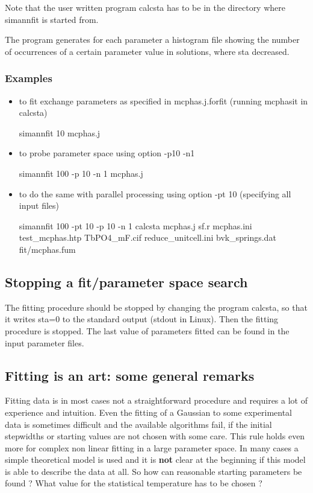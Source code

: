 Note that the user written program {\prg calcsta} has to be in the
directory where {\prg simannfit} is started from.

The program generates for each parameter a histogram file showing the number of occurrences
of a certain parameter value in solutions, where sta decreased.

\subsubsection{Examples}

\begin{itemize}
\item    to fit exchange parameters as specified in mcphas.j.forfit (running mcphasit in calcsta)
  
simannfit 10 mcphas.j     

\item    to probe parameter space using option -p10 -n1

 {\prg simannfit 100  -p 10 -n 1  mcphas.j}

\item     to do the same with parallel processing using option -pt 10 (specifying all input files)
  
 {\prg simannfit 100 -pt 10  -p 10 -n 1  calcsta mcphas.j sf.r mcphas.ini test\_mcphas.htp TbPO4\_mF.cif reduce\_unitcell.ini bvk\_springs.dat fit/mcphas.fum}

\end{itemize}
\subsection{Stopping a fit/parameter space search}

The fitting procedure should be stopped by changing the program {\prg calcsta}, so that it
writes {\prg sta=0} to the standard output (stdout in Linux). Then the fitting
procedure is stopped. The last value of parameters fitted can be found in the
input parameter files.

\subsection{Fitting is an art: some general remarks}

Fitting data is in most cases not a straightforward procedure and requires
a lot of experience and intuition. Even the fitting of a Gaussian to some
experimental data is sometimes difficult and the available algorithms fail,
 if the initial
stepwidths or starting values are not chosen with some care.
This rule holds even more for complex non linear fitting in a large
parameter space. In many cases a simple theoretical model is used
and it is {\bf not} clear at the beginning if this model is able
to describe the data at all. 
So how can reasonable starting parameters be found ? What value
for the statistical temperature has to be chosen ?


